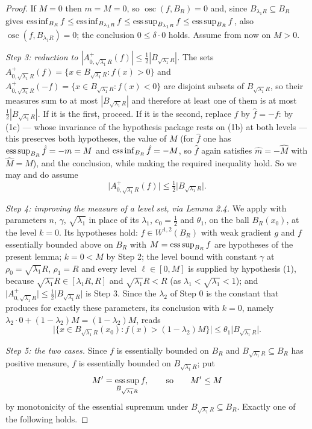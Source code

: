 \begin{proof}
If $M=0$ then $m=M=0$, so $\operatorname*{osc}(f,B_R)=0$ and, since
$B_{\lambda_1R}\subseteq B_R$ gives
$\operatorname*{ess\,inf}_{B_R}f\le\operatorname*{ess\,inf}_{B_{\lambda_1R}}f\le\operatorname*{ess\,sup}_{B_{\lambda_1R}}f
\le\operatorname*{ess\,sup}_{B_R}f$, also $\operatorname*{osc}(f,B_{\lambda_1R})=0$; the conclusion
$0\le\delta\cdot0$ holds.  Assume from now on $M>0$.

\emph{Step 3: reduction to $|A^+_{0,\sqrt{\lambda_1}R}(f)|\le\frac12
|B_{\sqrt{\lambda_1}R}|$.}  The sets $A^+_{0,\sqrt{\lambda_1}R}(f)=
\{x\in B_{\sqrt{\lambda_1}R}:f(x)>0\}$ and
$A^+_{0,\sqrt{\lambda_1}R}(-f)=\{x\in B_{\sqrt{\lambda_1}R}:f(x)<0\}$ are
disjoint subsets of $B_{\sqrt{\lambda_1}R}$, so their measures sum to at most
$|B_{\sqrt{\lambda_1}R}|$ and therefore at least one of them is at most
$\frac12|B_{\sqrt{\lambda_1}R}|$.  If it is the first, proceed.  If it is the
second, replace $f$ by $\hat f=-f$: by (1c) --- whose invariance of the
hypothesis package rests on (1b) at both levels --- this preserves both
hypotheses, the
value of $M$ (for $\hat f$ one has $\operatorname*{ess\,sup}_{B_R}\hat f=-m=M$ and
$\operatorname*{ess\,inf}_{B_R}\hat f=-M$, so $\hat f$ again satisfies $\hat m=-\hat M$ with
$\hat M=M$), and the conclusion, while making the required inequality hold.  So
we may and do assume
\[
\bigl|A^+_{0,\sqrt{\lambda_1}R}(f)\bigr|\le\tfrac12\bigl|B_{\sqrt{\lambda_1}R}\bigr| .
\]

\emph{Step 4: improving the measure of a level set, via Lemma 2.4.}  We apply
 with parameters $n$, $\gamma$,
$\sqrt{\lambda_1}$ in place of its $\lambda_1$, $c_0=\frac12$ and $\theta_1$, on
the ball $B_R(x_0)$, at the level $k=0$.  Its hypotheses hold:
$f\in W^{1,2}(B_R)$ with weak gradient $g$ and $f$ essentially bounded above on
$B_R$ with $M=\operatorname*{ess\,sup}_{B_R}f$ are hypotheses of the present lemma;
$k=0<M$ by Step 2; the level bound with constant $\gamma$ at
$\rho_0=\sqrt{\lambda_1}R$, $\rho_1=R$ and every level $\ell\in[0,M]$ is
supplied by hypothesis (1), because $\sqrt{\lambda_1}R\in[\lambda_1R,R]$ and
$\sqrt{\lambda_1}R<R$ (as $\lambda_1<\sqrt{\lambda_1}<1$); and
$\bigl|A^+_{0,\sqrt{\lambda_1}R}\bigr|\le\frac12\bigl|B_{\sqrt{\lambda_1}R}\bigr|$
is Step 3.  Since the $\lambda_2$ of Step 0 is the constant that
 produces for exactly these parameters, its
conclusion with $k=0$, namely
$\lambda_2\cdot0+(1-\lambda_2)M=(1-\lambda_2)M$, reads
\[
\bigl|\{x\in B_{\sqrt{\lambda_1}R}(x_0):f(x)>(1-\lambda_2)M\}\bigr|
\le\theta_1\bigl|B_{\sqrt{\lambda_1}R}\bigr| .
\tag{A}
\]

\emph{Step 5: the two cases.}  Since $f$ is essentially bounded on $B_R$ and
$B_{\sqrt{\lambda_1}R}\subseteq B_R$ has positive measure, $f$ is essentially
bounded on $B_{\sqrt{\lambda_1}R}$; put
\[
M'=\operatorname*{ess\,sup}_{B_{\sqrt{\lambda_1}R}}f ,\qquad\text{so}\qquad M'\le M
\]
by monotonicity of the essential supremum under
$B_{\sqrt{\lambda_1}R}\subseteq B_R$.  Exactly one of the following holds.


\end{proof}
